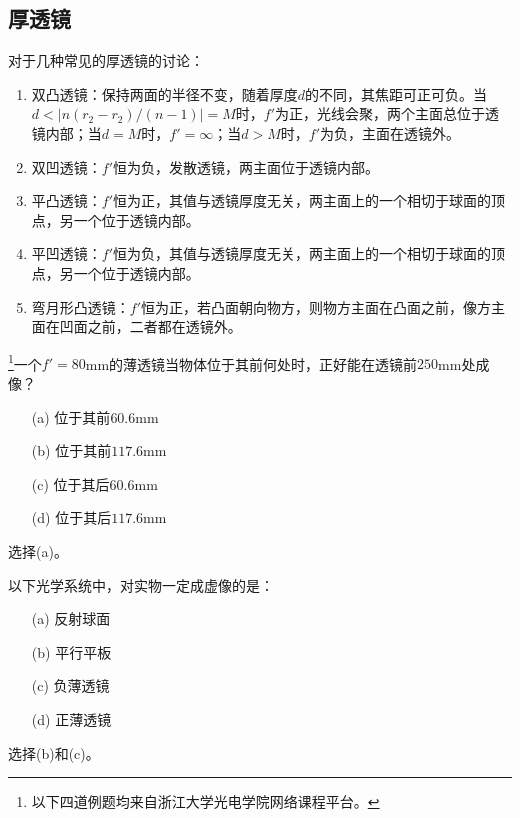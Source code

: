 \documentclass[cn,11pt]{elegantbook}
\begin{document}
\subsection{厚透镜}
对于几种常见的厚透镜的讨论：
\begin{enumerate}
	\item 双凸透镜：保持两面的半径不变，随着厚度$d$的不同，其焦距可正可负。当$d<|n(r_2-r_2)/(n-1)|=M$时，$f'$为正，光线会聚，两个主面总位于透镜内部；当$d=M$时，$f'=\infty$；当$d>M$时，$f'$为负，主面在透镜外。
	\item 双凹透镜：$f'$恒为负，发散透镜，两主面位于透镜内部。
	\item 平凸透镜：$f'$恒为正，其值与透镜厚度无关，两主面上的一个相切于球面的顶点，另一个位于透镜内部。
	\item 平凹透镜：$f'$恒为负，其值与透镜厚度无关，两主面上的一个相切于球面的顶点，另一个位于透镜内部。
	\item 弯月形凸透镜：$f'$恒为正，若凸面朝向物方，则物方主面在凸面之前，像方主面在凹面之前，二者都在透镜外。
\end{enumerate}

\begin{problem}
	\footnote{以下四道例题均来自浙江大学光电学院网络课程平台。}一个$f'=80$mm的薄透镜当物体位于其前何处时，正好能在透镜前$250$mm处成像？
	\begin{itemize}
		\item [(a)] 位于其前$60.6$mm
		\item [(b)] 位于其前$117.6$mm
		\item [(c)] 位于其后$60.6$mm
		\item [(d)] 位于其后$117.6$mm
	\end{itemize}
\end{problem}

\begin{solution}
	选择(a)。
\end{solution}

\begin{problem}
	以下光学系统中，对实物一定成虚像的是：
	\begin{itemize}
		\item [(a)] 反射球面
		\item [(b)] 平行平板
		\item [(c)] 负薄透镜
		\item [(d)] 正薄透镜
	\end{itemize}
\end{problem}

\begin{solution}
	选择(b)和(c)。
\end{solution}
\end{document}
